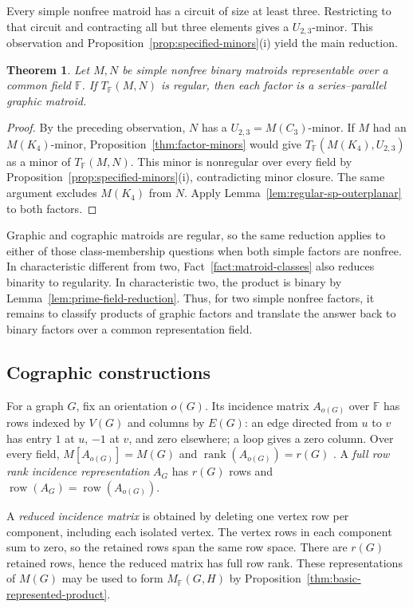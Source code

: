 \documentclass[12pt,a4paper]{article}
\numberwithin{equation}{section}
\DeclareMathOperator{\rank}{rank}
\DeclareMathOperator{\row}{row}
\newcommand{\F}{\mathbb F}
\newtheorem{theorem}{Theorem}[section]
\theoremstyle{definition}
\theoremstyle{remark}
\begin{document}
Every simple nonfree matroid has a circuit of size at least three.
Restricting to that circuit and contracting all but three elements
gives a \(U_{2,3}\)-minor.  This observation and
Proposition~\ref{prop:specified-minors}\textup{(i)} yield the main
reduction.
\begin{theorem}\label{thm:graphic-reduction}
Let \(M,N\) be simple nonfree binary matroids representable over
a common field \(\F\).
If \(T_{\F}(M,N)\) is regular, then each factor is a series--parallel
graphic matroid.
\end{theorem}
\begin{proof}
By the preceding observation, \(N\) has a \(U_{2,3}=M(C_3)\)-minor.
If \(M\) had an \(M(K_4)\)-minor, Proposition~\ref{thm:factor-minors}
would give \(T_{\F}(M(K_4),U_{2,3})\) as a minor of
\(T_{\F}(M,N)\).  This minor is nonregular over every field by
Proposition~\ref{prop:specified-minors}\textup{(i)}, contradicting minor
closure.  The same argument excludes \(M(K_4)\) from \(N\).
Apply Lemma~\ref{lem:regular-sp-outerplanar} to both factors.
\end{proof}

Graphic and cographic matroids are regular, so the same reduction
applies to either of those class-membership questions when both
simple factors are nonfree.  In characteristic different from two,
Fact~\ref{fact:matroid-classes} also reduces binarity to regularity.
In characteristic two, the product is binary by
Lemma~\ref{lem:prime-field-reduction}.  Thus, for two simple nonfree
factors, it remains to classify products of graphic factors and
translate the answer back to binary factors over a common
representation field.

\subsection{Cographic constructions}\label{subsec:cographic-constructions}
For a graph \(G\), fix an orientation \(o(G)\).  Its incidence
matrix \(A_{o(G)}\) over \(\F\) has rows indexed by \(V(G)\) and
columns by \(E(G)\): an edge directed from \(u\) to \(v\) has entry
\(1\) at \(u\), \(-1\) at \(v\), and zero elsewhere; a loop gives a
zero column.  Over every field,
\(M[A_{o(G)}]=M(G)\) and \(\rank(A_{o(G)})=r(G)\)
\cite[Lemma~5.1.3]{oxley}.  A \emph{full row rank incidence
representation} \(A_G\) has \(r(G)\) rows and
\(\row(A_G)=\row(A_{o(G)})\).

A \emph{reduced incidence matrix} is obtained by deleting one vertex
row per component, including each isolated vertex.  The vertex rows
in each component sum to zero, so the retained rows span the same
row space.  There are \(r(G)\) retained rows, hence the reduced
matrix has full row rank.  These representations of \(M(G)\) may be used to
form \(M_{\F}(G,H)\) by
Proposition~\ref{thm:basic-represented-product}.
\end{document}
